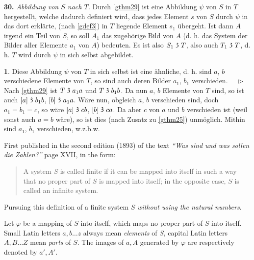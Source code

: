 \documentclass[leqno,hidelinks]{article}
\theoremstyle{definition}
\newtheorem{satz}{\protect\satzname}
\newcommand{\satzname}{}
\renewcommand{\satzname}{\hspace{-4pt}.\ Satz}%
\renewcommand{\satzname}{\hspace{-4pt}.\ Theorem}%
\newcommand\Beweis{\medskip \newline $ \phantom{'.'} \rhd \ $}%
\newcommand\TeilVon{\mathrel{\raisebox{0.45ex}{$\mathfrak{3}$}}}
\newcommand{\sref}[1]{\underline{\ref{#1}}}%
\begin{document}
\begin{paracol}{2}
\noindent \textbf{30.}\label{gthm30} \emph{Abbildung von $S$ nach $T$.}
Durch \sref{gthm29} ist eine Abbildung $\psi$ von $S$ in $T$ hergestellt, welche
dadurch definiert wird, dass jedes Element $s$ von $S$ durch $\psi$ in das dort
erklärte, (nach \sref{gdef3}) in $T$ liegende Element $s_1$ übergeht. Ist dann
$A$ irgend ein Teil von $S$, so soll $A_1$ das zugehörige Bild von $A$ (d. h.
das System der Bilder aller Elemente $a_1$ von $A$) bedeuten. Es ist also
$S_1 \TeilVon T$, also auch $T_1 \TeilVon T$, d. h. $T$ wird durch $\psi$ in sich
selbst abgebildet.

\begin{satz}\label{gthm31}
Diese Abbildung $\psi$ von $T$ in sich selbst ist eine ähnliche, d. h. sind $a$, $b$
verschiedene Elemente von $T$, so sind auch deren Bilder $a_1$, $b_1$ verschieden.
\Beweis
Nach \sref{gthm29} ist $T \TeilVon a_1a$ und $T \TeilVon b_1b$. Da nun $a$, $b$
Elemente von $T$ sind, so ist auch $[a] \TeilVon b_1b$, $[b] \TeilVon a_1a$. Wäre
nun, obgleich $a$, $b$ verschieden sind, doch $a_1 = b_1 = c$, so wäre
$[a] \TeilVon cb$, $[b] \TeilVon ca$. Da aber $c$ von $a$ und $b$ verschieden
ist (weil sonst auch $a = b$ wäre), so ist dies (nach Zusatz zu \sref{gthm25})
unmöglich. Mithin sind $a_1$, $b_1$ verschieden, w.z.b.w.
\end{satz}




\switchcolumn
{}

\noindent First published in the second edition (1893) of the text
\textit{``Was sind und was sollen die Zahlen?''} page XVII, in the form:%

\begin{quote}
A system $S$ is called finite if it can be mapped into itself in such a way that
no proper part of $S$ is mapped into itself; in the opposite case, $S$ is called
an infinite system.
\end{quote}

Pursuing this definition of a finite system $S$ \emph{without using the natural numbers}.

Let $\varphi$ be a mapping of $S$ into itself, which maps no proper part of $S$
into itself. Small Latin letters $a, b \ldots z$ always mean \emph{elements} of
$S$, capital Latin letters $A, B \ldots Z$ mean \emph{parts} of $S$. The images
of $a, A$ generated by $\varphi$ are respectively denoted by $a', A'$.
\ \\


\end{paracol}
\end{document}

